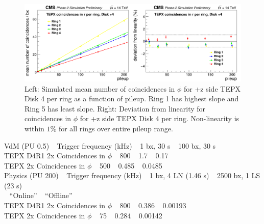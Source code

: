 \begin{figure}[H]
  \centering
  \includegraphics[width=1\columnwidth]{./coincidencesinrperringD+4.png}
  \caption{Left: Simulated mean number of coincidences in $\phi$ for +z side TEPX Disk 4 per ring as a function of pileup. Ring 1 has highest slope and Ring 5 has least slope. Right: Deviation from linearity for coincidences in $\phi$ for +z side TEPX Disk 4 per ring. Non-linearity is within $1\%$ for all rings over entire pileup range.}
  \label{fig:CMS}
\end{figure}







VdM (PU 0.5) $\:\:$  Trigger frequency (kHz) $\:\:$ 1 bx, 30 s $\:\:$ 100 bx, 30 s \\
TEPX D4R1 2x Coincidences in $\phi$  $\:\:$  800        $\:\:$   1.7         $\:\:$       0.17   \\
TEPX 2x Coincidences in $\phi$   $\:\:$     500        $\:\:$   0.485       $\:\:$       0.0485   \\




Physics (PU 200)  $\:\:$ Trigger frequency (kHz)   $\:\:$   1 bx, 4 LN (1.46 s)   $\:\:$     2500 bx, 1 LS (23 s)  \\
                                                      $\:\:$           ``Online''          $\:\:$           ``Offline''      \\
TEPX D4R1 2x Coincidences in $\phi$  $\:\:$   800                $\:\:$   0.386           $\:\:$            0.00193         \\
TEPX 2x Coincidences in $\phi$       $\:\:$   75           $\:\:$         0.284           $\:\:$            0.00142         \\

